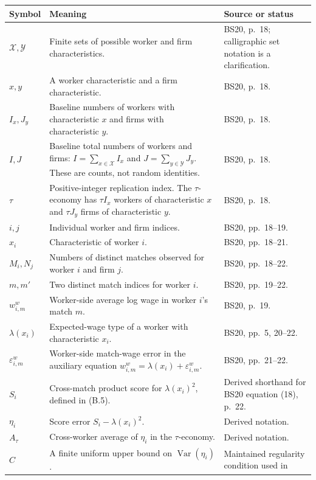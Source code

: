 \documentclass[11pt]{article}
\begin{document}
\begin{longtable}{p{}p{}p{}}
\textbf{Symbol} & \textbf{Meaning} & \textbf{Source or status} \\
\hline
\(\mathcal X,\mathcal Y\) & Finite sets of possible worker and firm
characteristics. & BS20, p.\ 18; calligraphic set notation is a
clarification. \\
\(x,y\) & A worker characteristic and a firm characteristic. & BS20,
p.\ 18. \\
\(I_x,J_y\) & Baseline numbers of workers with characteristic \(x\) and
firms with characteristic \(y\). & BS20, p.\ 18. \\
\(I,J\) & Baseline total numbers of workers and firms:
\(I=\sum_{x\in\mathcal X}I_x\) and
\(J=\sum_{y\in\mathcal Y}J_y\).  These are counts, not random identities. &
BS20, p.\ 18. \\
\(\tau\) & Positive-integer replication index.  The \(\tau\)-economy has
\(\tau I_x\) workers of characteristic \(x\) and \(\tau J_y\) firms of
characteristic \(y\). & BS20, p.\ 18. \\
\(i,j\) & Individual worker and firm indices. & BS20, pp.\ 18--19. \\
\(x_i\) & Characteristic of worker \(i\). & BS20, pp.\ 18--21. \\
\(M_i,N_j\) & Numbers of distinct matches observed for worker \(i\) and firm
\(j\). & BS20, pp.\ 18--22. \\
\(m,m'\) & Two distinct match indices for worker \(i\). & BS20,
pp.\ 19--22. \\
\(w^w_{i,m}\) & Worker-side average log wage in worker \(i\)'s match \(m\). &
BS20, p.\ 19. \\
\(\lambda(x_i)\) & Expected-wage type of a worker with characteristic
\(x_i\). & BS20, pp.\ 5, 20--22. \\
\(\varepsilon^w_{i,m}\) & Worker-side match-wage error in the auxiliary
equation \(w^w_{i,m}=\lambda(x_i)+\varepsilon^w_{i,m}\). & BS20,
pp.\ 21--22. \\
\(S_i\) & Cross-match product score for \(\lambda(x_i)^2\), defined in
(B.5). & Derived shorthand for BS20 equation (18), p.\ 22. \\
\(\eta_i\) & Score error \(S_i-\lambda(x_i)^2\). & Derived notation. \\
\(A_\tau\) & Cross-worker average of \(\eta_i\) in the \(\tau\)-economy. &
Derived notation. \\
\(C\) & A finite uniform upper bound on
\(\operatorname{Var}(\eta_i)\). & Maintained regularity condition used in

\end{longtable}
\end{document}
